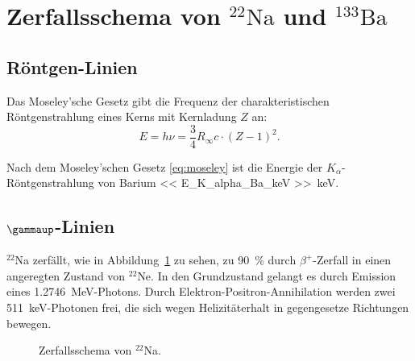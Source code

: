 \section{Zerfallsschema von ${}^{22}\text{Na}$ und ${}^{133}\text{Ba}$}

\subsection{Röntgen-Linien}

Das Moseley'sche Gesetz gibt die Frequenz der charakteristischen
Röntgenstrahlung eines Kerns mit Kernladung $Z$ an:
\parencite[(17.10)]{meschede-gerthsen_24}
\begin{equation}
    \label{eq:moseley}
    E = h \nu = \frac 34 R_\infty c \cdot (Z - 1)^2.
\end{equation}

Nach dem Moseley'schen Gesetz \eqref{eq:moseley} ist die Energie der
$K_\alpha$-Röntgenstrahlung von Barium \SI{<< E_K_alpha_Ba_keV
>>}{\kilo\electronvolt}.

\subsection{$\gammaup$-Linien}

${}^{22}$Na zerfällt, wie in Abbildung~\ref{fig:Na-Zerfall} zu sehen, zu
\SI{90}{\percent} durch $\beta^+$-Zerfall in einen angeregten Zustand von
${}^{22}$Ne. In den Grundzustand gelangt es durch Emission eines
\SI{1.2746}{\mega\electronvolt}-Photons. Durch Elektron-Positron-Annihilation
werden zwei \SI{511}{\kilo\electronvolt}-Photonen frei, die sich wegen
Helizitäterhalt in gegengesetze Richtungen bewegen.

\begin{figure}[htbp]
    \centering
    \caption{%
        Zerfallsschema von ${}^{22}$Na.
    }
    \label{fig:Na-Zerfall}
\end{figure}

